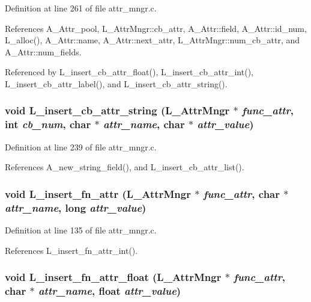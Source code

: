 Definition at line 261 of file attr\_\-mngr.c.

References A\_\-Attr\_\-pool, L\_\-Attr\-Mngr::cb\_\-attr, A\_\-Attr::field, A\_\-Attr::id\_\-num, L\_\-alloc(), A\_\-Attr::name, A\_\-Attr::next\_\-attr, L\_\-Attr\-Mngr::num\_\-cb\_\-attr, and A\_\-Attr::num\_\-fields.

Referenced by L\_\-insert\_\-cb\_\-attr\_\-float(), L\_\-insert\_\-cb\_\-attr\_\-int(), L\_\-insert\_\-cb\_\-attr\_\-label(), and L\_\-insert\_\-cb\_\-attr\_\-string().
\subsubsection{\setlength{\rightskip}{0pt plus 5cm}void L\_\-insert\_\-cb\_\-attr\_\-string (\bf{L\_\-Attr\-Mngr} $\ast$ {\em func\_\-attr}, int {\em cb\_\-num}, char $\ast$ {\em attr\_\-name}, char $\ast$ {\em attr\_\-value})}\label{attr__mngr_8c_770602f2a2b0ade8b2b46895042b62e8}




Definition at line 239 of file attr\_\-mngr.c.

References A\_\-new\_\-string\_\-field(), and L\_\-insert\_\-cb\_\-attr\_\-list().
\subsubsection{\setlength{\rightskip}{0pt plus 5cm}void L\_\-insert\_\-fn\_\-attr (\bf{L\_\-Attr\-Mngr} $\ast$ {\em func\_\-attr}, char $\ast$ {\em attr\_\-name}, long {\em attr\_\-value})}\label{attr__mngr_8c_720fa2501e4cdafc4013cc818bb965bf}




Definition at line 135 of file attr\_\-mngr.c.

References L\_\-insert\_\-fn\_\-attr\_\-int().
\subsubsection{\setlength{\rightskip}{0pt plus 5cm}void L\_\-insert\_\-fn\_\-attr\_\-float (\bf{L\_\-Attr\-Mngr} $\ast$ {\em func\_\-attr}, char $\ast$ {\em attr\_\-name}, float {\em attr\_\-value})}\label{attr__mngr_8c_02959ab51052802c689cd9a10efc9eb3}




